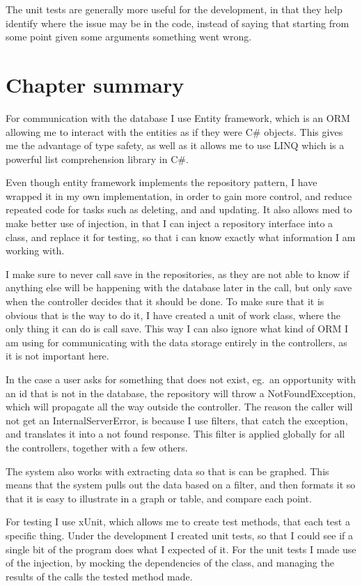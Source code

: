 The unit tests are generally more useful for the development, in that they help
identify where the issue may be in the code, instead of saying that starting
from some point given some arguments something went wrong.

\section{Chapter summary}
For communication with the database I use Entity framework, which is an ORM
allowing me to interact with the entities as if they were C\# objects. This
gives me the advantage of type safety, as well as it allows me to use LINQ which
is a powerful list comprehension library in C\#.

Even though entity framework implements the repository pattern, I have wrapped
it in my own implementation, in order to gain more control, and reduce repeated
code for tasks such as deleting, and and updating. It also allows med to make
better use of injection, in that I can inject a repository interface into a
class, and replace it for testing, so that i can know exactly what information I
am working with.

I make sure to never call save in the repositories, as they are not able to know
if anything else will be happening with the database later in the call, but only
save when the controller decides that it should be done. To make sure that it is
obvious that is the way to do it, I have created a unit of work class, where the
only thing it can do is call save. This way I can also ignore what kind of ORM I
am using for communicating with the data storage entirely in the controllers, as
it is not important here.

In the case a user asks for something that does not exist, eg.\ an opportunity
with an id that is not in the database, the repository will throw a
NotFoundException, which will propagate all the way outside the controller. The
reason the caller will not get an InternalServerError, is because I use filters,
that catch the exception, and translates it into a not found response. This
filter is applied globally for all the controllers, together with a few others.

The system also works with extracting data so that is can be graphed. This means
that the system pulls out the data based on a filter, and then formats it so
that it is easy to illustrate in a graph or table, and compare each point.

For testing I use xUnit, which allows me to create test methods, that each test
a specific thing. Under the development I created unit tests, so that I could
see if a single bit of the program does what I expected of it. For the unit
tests I made use of the injection, by mocking the dependencies of the class, and
managing the results of the calls the tested method made.

